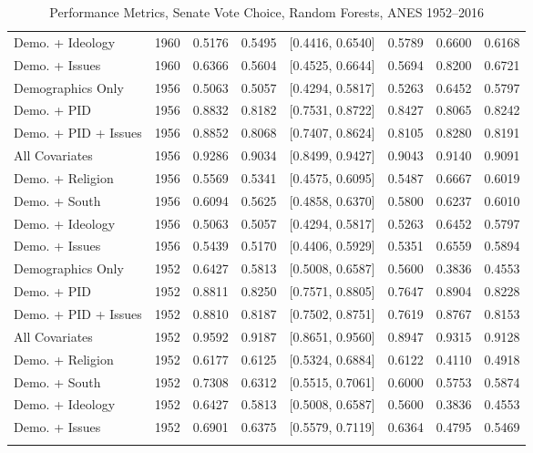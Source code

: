 \begin{longtable}{lrrrlrrr}
  Demo. + Ideology & 1960 & 0.5176 & 0.5495 & [0.4416, 0.6540] & 0.5789 & 0.6600 & 0.6168 \\ 
  Demo. + Issues & 1960 & 0.6366 & 0.5604 & [0.4525, 0.6644] & 0.5694 & 0.8200 & 0.6721 \\ 
  Demographics Only & 1956 & 0.5063 & 0.5057 & [0.4294, 0.5817] & 0.5263 & 0.6452 & 0.5797 \\ 
  Demo. + PID & 1956 & 0.8832 & 0.8182 & [0.7531, 0.8722] & 0.8427 & 0.8065 & 0.8242 \\ 
  Demo. + PID + Issues & 1956 & 0.8852 & 0.8068 & [0.7407, 0.8624] & 0.8105 & 0.8280 & 0.8191 \\ 
  All Covariates & 1956 & 0.9286 & 0.9034 & [0.8499, 0.9427] & 0.9043 & 0.9140 & 0.9091 \\ 
  Demo. + Religion & 1956 & 0.5569 & 0.5341 & [0.4575, 0.6095] & 0.5487 & 0.6667 & 0.6019 \\ 
  Demo. + South & 1956 & 0.6094 & 0.5625 & [0.4858, 0.6370] & 0.5800 & 0.6237 & 0.6010 \\ 
  Demo. + Ideology & 1956 & 0.5063 & 0.5057 & [0.4294, 0.5817] & 0.5263 & 0.6452 & 0.5797 \\ 
  Demo. + Issues & 1956 & 0.5439 & 0.5170 & [0.4406, 0.5929] & 0.5351 & 0.6559 & 0.5894 \\ 
  Demographics Only & 1952 & 0.6427 & 0.5813 & [0.5008, 0.6587] & 0.5600 & 0.3836 & 0.4553 \\ 
  Demo. + PID & 1952 & 0.8811 & 0.8250 & [0.7571, 0.8805] & 0.7647 & 0.8904 & 0.8228 \\ 
  Demo. + PID + Issues & 1952 & 0.8810 & 0.8187 & [0.7502, 0.8751] & 0.7619 & 0.8767 & 0.8153 \\ 
  All Covariates & 1952 & 0.9592 & 0.9187 & [0.8651, 0.9560] & 0.8947 & 0.9315 & 0.9128 \\ 
  Demo. + Religion & 1952 & 0.6177 & 0.6125 & [0.5324, 0.6884] & 0.6122 & 0.4110 & 0.4918 \\ 
  Demo. + South & 1952 & 0.7308 & 0.6312 & [0.5515, 0.7061] & 0.6000 & 0.5753 & 0.5874 \\ 
  Demo. + Ideology & 1952 & 0.6427 & 0.5813 & [0.5008, 0.6587] & 0.5600 & 0.3836 & 0.4553 \\ 
  Demo. + Issues & 1952 & 0.6901 & 0.6375 & [0.5579, 0.7119] & 0.6364 & 0.4795 & 0.5469 \\ 
   \bottomrule
\caption{Performance Metrics, Senate Vote Choice, Random Forests, ANES 1952--2016} 
\label{tab:ANES_senate_rf}
\end{longtable}
